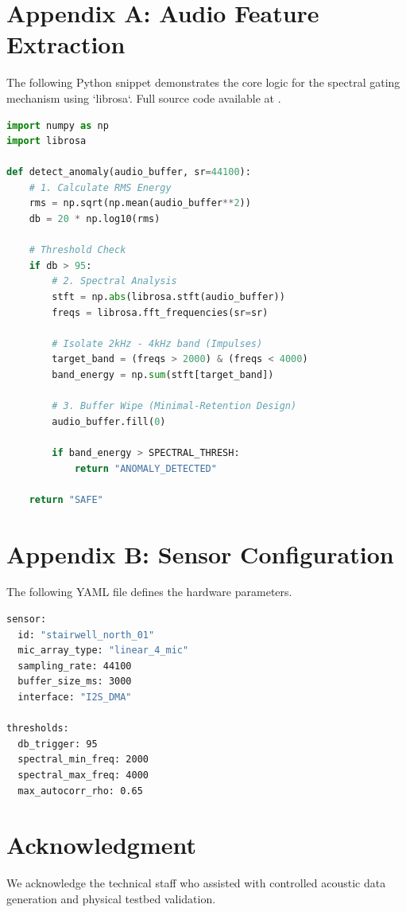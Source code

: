\documentclass[conference]{IEEEtran}
\begin{document}
\section*{Appendix A: Audio Feature Extraction}
The following Python snippet demonstrates the core logic for the spectral gating mechanism using `librosa`. Full source code available at \cite{scholarmaster_repo}.

\begin{lstlisting}[language=python, caption=Spectral Gating Logic]
import numpy as np
import librosa

def detect_anomaly(audio_buffer, sr=44100):
    # 1. Calculate RMS Energy
    rms = np.sqrt(np.mean(audio_buffer**2))
    db = 20 * np.log10(rms)
      
    # Threshold Check
    if db > 95: 
        # 2. Spectral Analysis
        stft = np.abs(librosa.stft(audio_buffer))
        freqs = librosa.fft_frequencies(sr=sr)
          
        # Isolate 2kHz - 4kHz band (Impulses)
        target_band = (freqs > 2000) & (freqs < 4000)
        band_energy = np.sum(stft[target_band])
          
        # 3. Buffer Wipe (Minimal-Retention Design)
        audio_buffer.fill(0) 
          
        if band_energy > SPECTRAL_THRESH:
            return "ANOMALY_DETECTED"
            
    return "SAFE"
\end{lstlisting}

\section*{Appendix B: Sensor Configuration}
The following YAML file defines the hardware parameters.

\begin{lstlisting}[language=bash, caption=Sensor Config]
sensor:
  id: "stairwell_north_01"
  mic_array_type: "linear_4_mic"
  sampling_rate: 44100
  buffer_size_ms: 3000
  interface: "I2S_DMA"
    
thresholds:
  db_trigger: 95
  spectral_min_freq: 2000
  spectral_max_freq: 4000
  max_autocorr_rho: 0.65
\end{lstlisting}

\section*{Acknowledgment}
We acknowledge the technical staff who assisted with controlled acoustic data generation and physical testbed validation.
\end{document}
